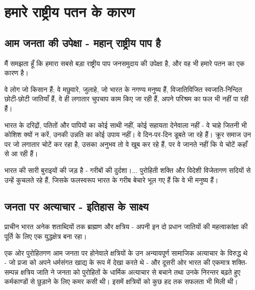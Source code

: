 
\chapter{हमारे राष्ट्रीय पतन के कारण }

\indentsecionsintoc



\section*{आम जनता की उपेक्षा - महान् राष्ट्रीय पाप है}


मैं समझता हूँ कि हमारा सबसे बड़ा राष्ट्रीय पाप जनसमुदाय की उपेक्षा है, और वह भी हमारे पतन का एक कारण है। 

वे लोग जो किसान हैं; वे मछुवारे, जुलाहे, जो भारत के नगण्य मनुष्य हैं, विजातिविजित स्वजाति-निन्दित छोटी-छोटी जातियाँ हैं, वे ही लगातार चुपचाप काम किए जा रही हैं, अपने परिश्रम का फल भी नहीं पा रही हैं। 

भारत के दरिद्रों, पतितों और पापियों का कोई साथी नहीं, कोई सहायता देनेवाला नहीं - वे चाहे जितनी भी कोशिश क्यों न करें, उनकी उन्नति का कोई उपाय नहीं। वे दिन-पर-दिन डूबते जा रहे हैं। क्रूर समाज उन पर जो लगातार चोटें कर रहा है, उसका अनुभव तो वे खूब कर रहे हैं, पर वे जानते नहीं कि ये चोटें कहाँ से आ रही हैं। 

भारत की सारी बुराइयों की जड़ है - गरीबों की दुर्दशा।... पुरोहिती शक्ति और विदेशी विजेतागण सदियों से उन्हें कुचलते रहे हैं, जिसके फलस्वरूप भारत के गरीब बेचारे भूल गए हैं कि वे भी मनुष्य हैं।


\section*{जनता पर अत्याचार - इतिहास के साक्ष्य}


प्राचीन भारत अनेक शताब्दियों तक ब्राह्मण और क्षत्रिय - अपनी इन दो प्रधान जातियों की महत्वाकांक्षा की पूर्ति के लिए एक युद्धक्षेत्र बना रहा। 

एक ओर पुरोहितगण आम जनता पर होनेवाले क्षत्रियों के उन अन्यायपूर्ण सामाजिक अत्याचार के विरुद्ध थे - जो प्रजा को अपने धर्मसंगत खाद्य के रूप में देखा करते थे - और दूसरी ओर भारत की एकमात्र शक्ति-सम्पन्न क्षत्रिय जाति ने जनता को पुरोहितों के धार्मिक अत्याचार से बचाने तथा उनके निरन्तर बढ़ते हुए कर्मकाण्डों से छुड़ाने के लिए कमर कसी थी। इसमें क्षत्रियों को कुछ हद तक सफलता भी मिली थी। 

